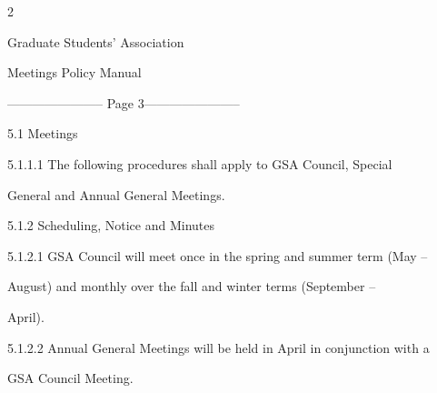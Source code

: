  

  

  

  

  

  

  

  

  

  

  

  

  

  

  

  

  

  



                                                                           2  

                                                   

                                               Graduate Students’ Association  

                                                    Meetings Policy Manual  

  


----------------------- Page 3-----------------------

                                          5.1      Meetings   

  

5.1.1.1   The  following  procedures  shall  apply  to  GSA  Council,  Special  

            General and Annual General Meetings.   

  

  

                          5.1.2        Scheduling, Notice and Minutes  

  

5.1.2.1   GSA Council will meet once in the spring and summer term (May –  

            August)  and monthly over  the  fall  and  winter  terms  (September  –  

            April).   

  

5.1.2.2  Annual General Meetings will be held in April in conjunction with a  

            GSA Council Meeting.   

  


